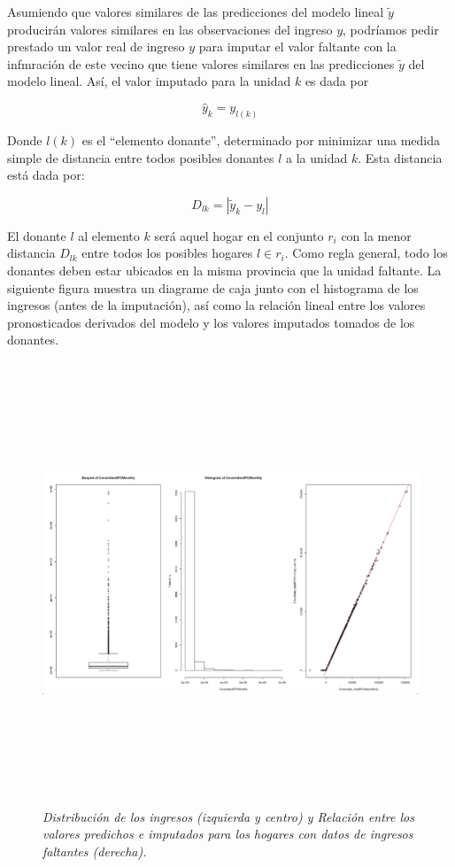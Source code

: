 \documentclass[12pt,spanish,]{book}
\begin{document}
Asumiendo que valores similares de las predicciones del modelo lineal \(\tilde y\) producirán valores similares en las observaciones del ingreso \(y\), podríamos pedir prestado un valor real de ingreso \(y\) para imputar el valor faltante con la infmración de este vecino que tiene valores similares en las predicciones \(\tilde y\) del modelo lineal. Así, el valor imputado para la unidad \(k\) es dada por

\[\hat{y}_k = y_{l(k)}\]

Donde \(l(k)\) es el ``elemento donante'', determinado por minimizar una medida simple de distancia entre todos posibles donantes \(l\) a la unidad \(k\). Esta distancia está dada por:

\[
D_{lk} = |\tilde y_k - y_l|
\]

El donante \(l\) al elemento \(k\) será aquel hogar en el conjunto \(r_i\) con la menor distancia \(D_{lk}\) entre todos los posibles hogares \(l\in r_i\). Como regla general, todo los donantes deben estar ubicados en la misma provincia que la unidad faltante. La siguiente figura muestra un diagrame de caja junto con el histograma de los ingresos (antes de la imputación), así como la relación lineal entre los valores pronosticados derivados del modelo y los valores imputados tomados de los donantes.

\begin{figure}
\centering
\includegraphics[width=\textwidth,height=5.20833in]{Pics/10.png}
\caption{\emph{Distribución de los ingresos (izquierda y centro) y Relación entre los valores predichos e imputados para los hogares con datos de ingresos faltantes (derecha).}}
\end{figure}
\end{document}
